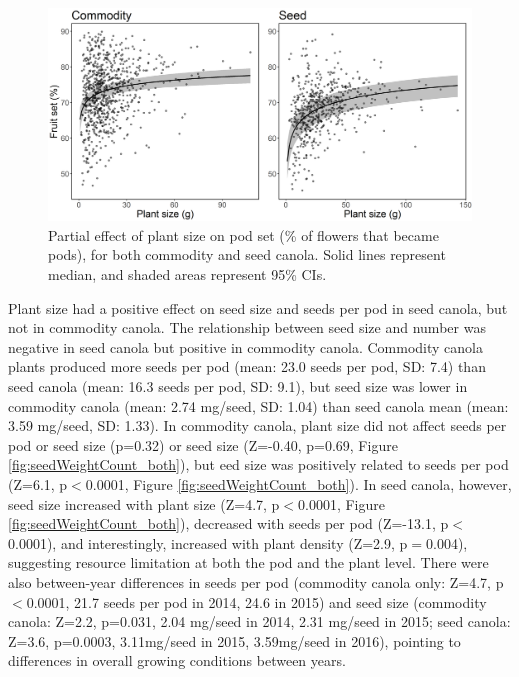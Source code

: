\documentclass[12pt]{article} %
\begin{document}
\begin{figure}
    \centering
    \includegraphics[width=\textwidth,keepaspectratio=true]{plSizeFlwSurv_both.png} 
    \caption[Partial effect of plant size on pod set]{Partial effect of plant size on pod set (\% of flowers that became pods), for both commodity and seed canola. Solid lines represent median, and shaded areas represent 95\% CIs.}
    \label{fig:flwSurv_both}
\end{figure}

Plant size had a positive effect on seed size and seeds per pod in seed canola, but not in commodity canola. 
The relationship between seed size and number was negative in seed canola but positive in commodity canola.
Commodity canola plants produced more seeds per pod (mean: 23.0 seeds per pod, SD: 7.4) than seed canola (mean: 16.3 seeds per pod, SD: 9.1), 
but seed size was lower in commodity canola (mean: 2.74 mg/seed, SD: 1.04) than seed canola mean (mean: 3.59 mg/seed, SD: 1.33).
In commodity canola, plant size did not affect seeds per pod or seed size (p=0.32) or seed size (Z=-0.40, p=0.69, Figure \ref{fig:seedWeightCount_both}), but eed size was positively related to seeds per pod (Z=6.1, p$<$0.0001, Figure \ref{fig:seedWeightCount_both}).
In seed canola, however, seed size increased with plant size (Z=4.7, p$<$0.0001, Figure \ref{fig:seedWeightCount_both}), decreased with seeds per pod (Z=-13.1, p$<$0.0001), and interestingly, increased with plant density (Z=2.9, p$=$0.004), suggesting resource limitation at both the pod and the plant level. 
There were also between-year differences in seeds per pod (commodity canola only: Z=4.7, p$<$0.0001, 21.7 seeds per pod in 2014, 24.6 in 2015) and seed size (commodity canola: Z=2.2, p=0.031, 2.04 mg/seed in 2014, 2.31 mg/seed in 2015; seed canola: Z=3.6, p=0.0003, 3.11mg/seed in 2015, 3.59mg/seed in 2016), pointing to differences in overall growing conditions between years.
\end{document}
